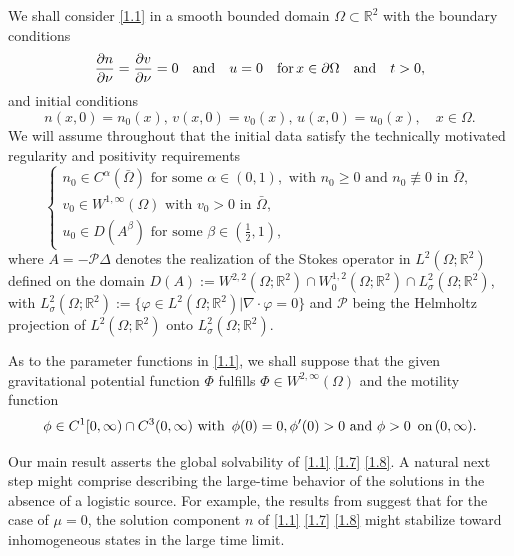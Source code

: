 \documentclass[12pt]{article}
\theoremstyle{plain}
\theoremstyle{definition}
\numberwithin{equation}{section}
\begin{document}
We shall consider \eqref{1.1} in a smooth bounded domain $\Omega\subset \mathbb{R}^2$ with the
 boundary conditions
  \begin{equation}\label{1.7}
 \frac{\partial n}{\partial \nu}=\frac{\partial v}{\partial \nu}=0\quad\hbox{and}\quad
  u=0\quad \hbox{for}\, x\in \partial\Omega \quad\hbox{and}\quad t>0,
\end{equation}
 and initial conditions
 \begin{equation}\label{1.8}
 n(x,0)=n_0(x),\,v(x,0)=v_0(x),\,u(x,0)=u_0(x),\quad x\in \Omega.
\end{equation}
We will assume throughout that the initial data satisfy the technically motivated regularity and positivity requirements
\begin{equation}\label{1.9}
\left\{\begin{array}{l}
n_0\in C^\alpha(\bar{\Omega})\mbox{ for some }\alpha\in(0,1),\mbox{ with }n_0\geq0\mbox{ and }n_0\not\equiv0\mbox{ in }\bar{\Omega},\\
v_0\in W^{1,\infty}(\Omega)\mbox{ with }v_0>0\mbox{ in }\bar{\Omega},\\
u_0\in D(A^\beta)\mbox{ for some }\beta\in(\frac{1}{2},1),
\end{array}
\right.
\end{equation}
where $A=-\mathcal{P}\Delta$ denotes the realization of the Stokes operator in $L^2(\Omega;\mathbb{R}^2)$ defined on the domain $D(A):=W^{2,2}(\Omega;\mathbb{R}^2)\cap W_0^{1,2}(\Omega;\mathbb{R}^2)\cap L_\sigma^{2}(\Omega;\mathbb{R}^2)$, with $L_\sigma^2(\Omega;\mathbb{R}^2):=\{\varphi\in L^{2}(\Omega;\mathbb{R}^2)|\nabla\cdot\varphi=0\}$ and $\mathcal{P}$ being the Helmholtz projection of $L^2(\Omega;\mathbb{R}^2)$ onto $L_\sigma^2(\Omega;\mathbb{R}^2)$.

As to the parameter functions in  \eqref{1.1}, we shall suppose that
 the given gravitational potential function $\Phi$ fulfills
$\Phi\in W^{2,\infty}(\Omega)$ and the motility function
\begin{equation}\label{1.10}
\phi\in C^1[0,\infty)\cap C^3(0,\infty)\, \, \hbox{with } \,    \phi(0)=0, \phi'(0)>0\,  \,   \hbox {and}  \,  \,  \phi>0\,  \,   \, \hbox{on}\,(0,\infty).
 \end{equation}

Our main result asserts the global solvability of \eqref{1.1} \eqref{1.7} \eqref{1.8}. A natural next step might comprise describing the large-time behavior
of the solutions in the absence of a logistic source.
For example, the results from \cite{WinklerAIHP}
 suggest that  for the case of  $\mu=0$, the solution component $n$ of  \eqref{1.1} \eqref{1.7} \eqref{1.8}
 might stabilize toward inhomogeneous states in the large
time limit.
\end{document}
